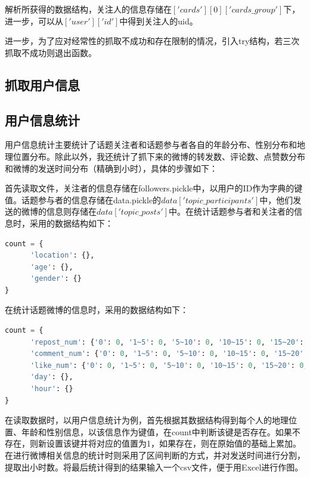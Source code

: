 \documentclass[a4paper,UTF8]{ctexart}
\begin{document}
解析所获得的数据结构，关注人的信息存储在$['cards'][0]['cards\_group']$下，进一步，可以从$['user']['id']$中得到关注人的uid。

进一步，为了应对经常性的抓取不成功和存在限制的情况，引入try结构，若三次抓取不成功则退出函数。


\subsection{抓取用户信息}


\subsection{用户信息统计}
用户信息统计主要统计了话题关注者和话题参与者各自的年龄分布、性别分布和地理位置分布。除此以外，我还统计了抓下来的微博的转发数、评论数、点赞数分布和微博的发送时间分布（精确到小时），具体的步骤如下：

首先读取文件，关注者的信息存储在followers.pickle中，以用户的ID作为字典的键值。话题参与者的信息存储在data.pickle的$data['topic\_participants']$中，他们发送的微博的信息则存储在$data['topic\_posts']$中。在统计话题参与者和关注者的信息时，采用的数据结构如下：
\begin{lstlisting}[language = Python]
count = {
      'location': {},
      'age': {},
      'gender': {}
}
\end{lstlisting}

在统计话题微博的信息时，采用的数据结构如下：
\begin{lstlisting}[language = Python]
count = {
      'repost_num': {'0': 0, '1~5': 0, '5~10': 0, '10~15': 0, '15~20': 0, '20~50': 0, '50~100': 0, '>=100': 0},
      'comment_num': {'0': 0, '1~5': 0, '5~10': 0, '10~15': 0, '15~20': 0, '20~50': 0, '50~100': 0, '>=100': 0},
      'like_num': {'0': 0, '1~5': 0, '5~10': 0, '10~15': 0, '15~20': 0, '20~50': 0, '50~100': 0, '>=100': 0},
      'day': {},
      'hour': {}
}
\end{lstlisting}

在读取数据时，以用户信息统计为例，首先根据其数据结构得到每个人的地理位置、年龄和性别信息，以该信息作为键值，在count中判断该键是否存在。如果不存在，则新设置该键并将对应的值置为1，如果存在，则在原始值的基础上累加。在进行微博相关信息的统计时则采用了区间判断的方式，并对发送时间进行分割，提取出小时数。将最后统计得到的结果输入一个csv文件，便于用Excel进行作图。
\end{document}
